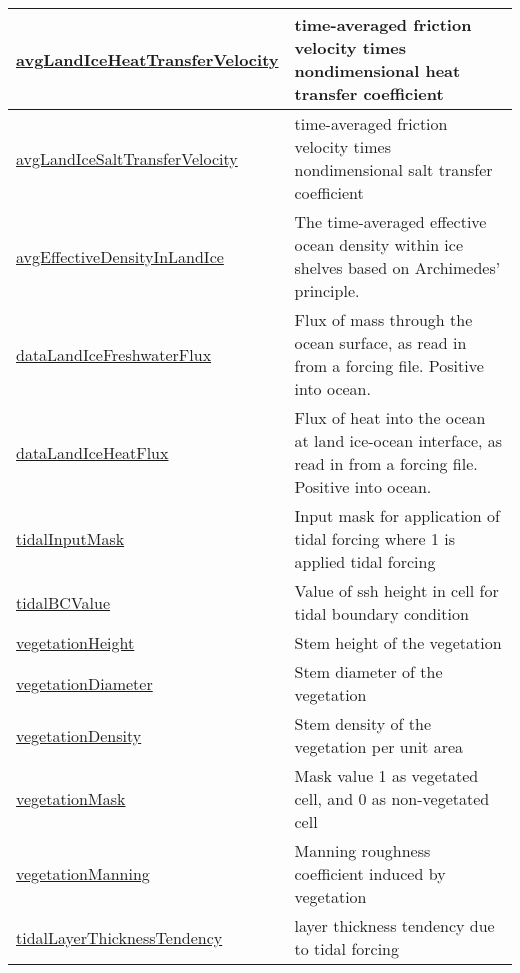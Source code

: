 {\begin{center}
\begin{longtable}{| p{2.0in} | p{4.0in} |}
    \hline
    \hyperref[subsec:var_sec_forcing_avgLandIceHeatTransferVelocity]{avgLandIceHeatTransferVelocity} & time-averaged friction velocity times nondimensional heat transfer coefficient \\
    \hline
    \hyperref[subsec:var_sec_forcing_avgLandIceSaltTransferVelocity]{avgLandIceSaltTransferVelocity} & time-averaged friction velocity times nondimensional salt transfer coefficient \\
    \hline
    \hyperref[subsec:var_sec_forcing_avgEffectiveDensityInLandIce]{avgEffectiveDensityInLandIce} & The time-averaged effective ocean density within ice shelves based on Archimedes' principle. \\
    \hline
    \hyperref[subsec:var_sec_forcing_dataLandIceFreshwaterFlux]{dataLandIceFreshwaterFlux} & Flux of mass through the ocean surface, as read in from a forcing file. Positive into ocean. \\
    \hline
    \hyperref[subsec:var_sec_forcing_dataLandIceHeatFlux]{dataLandIceHeatFlux} & Flux of heat into the ocean at land ice-ocean interface, as read in from a forcing file. Positive into ocean. \\
    \hline
    \hyperref[subsec:var_sec_forcing_tidalInputMask]{tidalInputMask} & Input mask for application of tidal forcing where 1 is applied tidal forcing \\
    \hline
    \hyperref[subsec:var_sec_forcing_tidalBCValue]{tidalBCValue} & Value of ssh height in cell for tidal boundary condition \\
    \hline
    \hyperref[subsec:var_sec_forcing_vegetationHeight]{vegetationHeight} & Stem height of the vegetation \\
    \hline
    \hyperref[subsec:var_sec_forcing_vegetationDiameter]{vegetationDiameter} & Stem diameter of the vegetation \\
    \hline
    \hyperref[subsec:var_sec_forcing_vegetationDensity]{vegetationDensity} & Stem density of the vegetation per unit area \\
    \hline
    \hyperref[subsec:var_sec_forcing_vegetationMask]{vegetationMask} & Mask value 1 as vegetated cell, and 0 as non-vegetated cell \\
    \hline
    \hyperref[subsec:var_sec_forcing_vegetationManning]{vegetationManning} & Manning roughness coefficient induced by vegetation \\
    \hline
    \hyperref[subsec:var_sec_forcing_tidalLayerThicknessTendency]{tidalLayerThicknessTendency} & layer thickness tendency due to tidal forcing \\

\end{longtable}
\end{center}}
